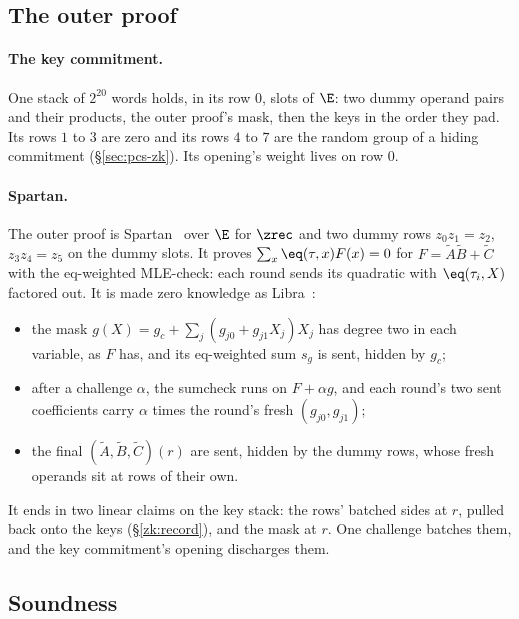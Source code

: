 \subsection{The outer proof}\label{zk:outer}\label{zk:keys}

\paragraph{The key commitment.} One stack of $2^{20}$ words holds, in its row $0$, slots of $\E$: two dummy operand pairs and their products, the outer proof's mask, then the keys in the order they pad. Its rows $1$ to $3$ are zero and its rows $4$ to $7$ are the random group of a hiding commitment (\S\ref{sec:pcs-zk}). Its opening's weight lives on row $0$.

\paragraph{Spartan.} The outer proof is Spartan~\cite{Set20} over $\E$ for $\zrec$ and two dummy rows $z_0 z_1 = z_2$, $z_3 z_4 = z_5$ on the dummy slots. It proves $\sum_x \eq(\tau, x) F(x) = 0$ for $F = \tilde A \tilde B + \tilde C$ with the eq-weighted MLE-check: each round sends its quadratic with $\eq(\tau_i, X)$ factored out. It is made zero knowledge as Libra~\cite{XZZPS19}:
\begin{itemize}[itemsep=1pt,topsep=2pt]
\item the mask $g(X) = g_c + \sum_j (g_{j0} + g_{j1} X_j) X_j$ has degree two in each variable, as $F$ has, and its eq-weighted sum $s_g$ is sent, hidden by $g_c$;
\item after a challenge $\alpha$, the sumcheck runs on $F + \alpha g$, and each round's two sent coefficients carry $\alpha$ times the round's fresh $(g_{j0}, g_{j1})$;
\item the final $(\tilde A, \tilde B, \tilde C)(r)$ are sent, hidden by the dummy rows, whose fresh operands sit at rows of their own.
\end{itemize}
It ends in two linear claims on the key stack: the rows' batched sides at $r$, pulled back onto the keys (\S\ref{zk:record}), and the mask at $r$. One challenge batches them, and the key commitment's opening discharges them.

\subsection{Soundness}\label{zk:soundness}

